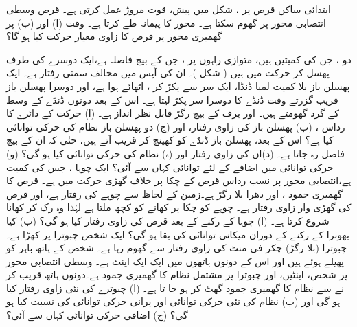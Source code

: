 ابتدائی ساکن قرص پر  ، شکل  میں پیش، قوت مروڑ  عمل کرتی ہے۔ قرص وسطی انتصابی  محور  پر گھوم سکتا ہے۔ محور  کا پیمانہ  طے کرتا ہے۔ وقت (ا)   اور (ب)    پر  گھمیری محور پر قرص کا زاوی معیار حرکت کیا ہو گا؟

 دو   ، جن کی کمیتیں   ہیں،  متوازی راہوں پر ، جن کے بیچ   فاصلہ ہے،ایک دوسرے کی طرف  پھسل کر حرکت میں ہیں ( شکل  )۔ ان کی آپس میں مخالف سمتی رفتار  ہے۔ ایک پھسلن باز بلا کمیت لمبا ڈنڈا،  ایک  سر سے پکڑ کر  ، اٹھائے ہوا ہے، اور دوسرا پھسلن باز قریب گزرتے وقت   ڈنڈے کا دوسرا سر پکڑ لیتا  ہے۔  اس کے بعد  دونوں ڈنڈے کے وسط کے گرد گھومتے ہیں۔ اور برف کے بیچ رگڑ قابل نظر انداز ہے۔ (ا) حرکت کے دائرے کا رداس ، (ب) پھسلن باز کی زاوی رفتار، اور (ج) دو پھسلن باز نظام کی حرکی توانائی کیا ہے؟ اس کے بعد، پھسلن باز ڈنڈے کو کھینچ کر قریب آتے ہیں، حتٰی کہ ان کے بیچ فاصل  رہ جاتا ہے۔  (د)ان کی   زاوی رفتار اور  (ہ) نظام  کی حرکی توانائی کیا ہو گی؟ (و) حرکی توانائی میں اضافے کے لئے توانائی کہاں سے آئی؟
ایک چوہا ، جس کی کمیت  ہے،انتصابی محور پر نسب  رداس   قرص کے چکا پر خلاف گھڑی  حرکت میں ہے۔ قرص کا گھمیری جمود  ، اور دھرا بلا رگڑ ہے۔زمین کے لحاظ  سے  چوہے   کی رفتار
  ہے، اور قرص کی گھڑی وار  زاوی رفتار   ہے۔ چوہے کو چکا پر کھانے کو کچھ ملتا ہے لہٰذا وہ رک کر  کھانا  شروع کرتا ہے۔ (ا)  چوہا کے رکنے کے بعد قرص کی زاوی رفتار کیا ہو گی؟ (ب)  کیا بھونرا کے رکنے کے دوران میکانی توانائی کی بقا ہو گی؟
ایک شخص  چبوترا پر کھڑا ہے۔ چبوترا  (بلا رگڑ)  چکر فی منٹ کی زاوی رفتار سے گھوم رہا ہے۔ شخص کے ہاتھ  باہر کو پھیلے ہوئے ہیں اور اس کے  دونوں ہاتھوں میں ایک ایک اینٹ ہے۔ وسطی انتصابی محور پر شخص، اینٹیں، اور چبوترا پر مشتمل نظام کا گھمیری جمود  ہے۔دونوں   ہاتھ قریب کر نے سے  نظام کا گھمیری جمود گھٹ کر  ہو جا تا ہے۔ (ا) چبوترے کی نئی زاوی رفتار کیا ہو گی اور (ب)  نظام کی نئی حرکی توانائی اور پرانی حرکی توانائی کی نسبت کیا ہو گی؟ (ج)  اضافی حرکی توانائی کہاں سے آئی؟
